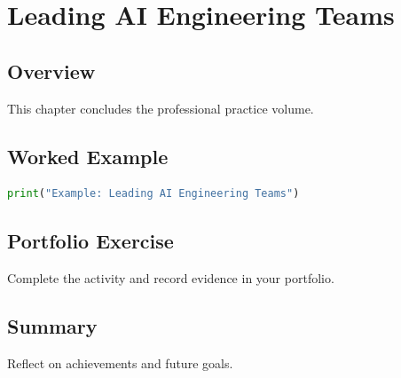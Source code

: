 \chapter{Leading AI Engineering Teams}
\label{chap:vol15-8}



\section{Overview}
This chapter concludes the professional practice volume.

\section{Worked Example}
\begin{lstlisting}[language=Python]
print("Example: Leading AI Engineering Teams")
\end{lstlisting}

\section{Portfolio Exercise}
Complete the activity and record evidence in your portfolio.

\section{Summary}
Reflect on achievements and future goals.
